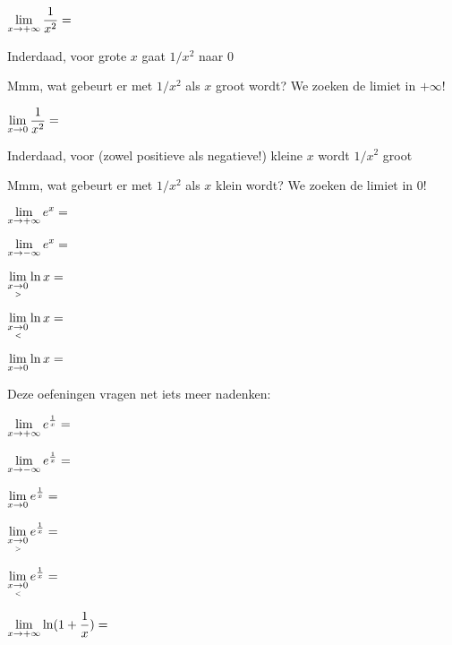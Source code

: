 \documentclass{ximera}
\begin{document}
\begin{exercise}
		\begin{question} \def\isC{correct}   $\limxi    \frac{1}{x^2}= \;$   \localoefoptions 
			\begin{feedback}[correct]Inderdaad, voor grote $x$  gaat $1/x^2$ naar $0$\end{feedback}	
			\begin{feedback}[attempt]Mmm, wat gebeurt er met $1/x^2$ als $x$ groot wordt? We zoeken de limiet in $+\infty$!\end{feedback}
		\end{question}
		\begin{question} \def\isA{correct}   $\limx     \frac{1}{x^2}= \;$   \localoefoptions 
			\begin{feedback}[correct]Inderdaad, voor (zowel positieve als negatieve!) kleine $x$ wordt $1/x^2$ groot \end{feedback}	
			\begin{feedback}[attempt]Mmm, wat gebeurt er met $1/x^2$ als $x$ klein wordt? We zoeken de limiet in $0$!\end{feedback}
		\end{question}

		\begin{question} \def\isA{correct}   $\limxi    e^x = \;$            \localoefoptions \end{question}
		\begin{question} \def\isB{correct}   $\limxmi   e^x = \;$            \localoefoptions \end{question}
		\begin{question} \def\isB{correct}   $\rlimx    \ln x = \;$          \localoefoptions \end{question}
		\begin{question} \def\isE{correct}   $\llimx    \ln x = \;$          \localoefoptions \end{question}
		\begin{question} \def\isE{correct}   $\limxz    \ln x = \;$          \localoefoptions \end{question}
		Deze oefeningen vragen net iets meer nadenken:				
		\begin{question} \def\isD{correct}   $\limxi    e^{\frac 1x} = \;$   \localoefoptions \end{question}
		\begin{question} \def\isC{correct}   $\limxmi   e^{\frac 1x} = \;$   \localoefoptions \end{question}
		\begin{question} \def\isE{correct}   $\limxz     e^{\frac 1x} = \;$   \localoefoptions \end{question}
		\begin{question} \def\isA{correct}   $\rlimx    e^{\frac 1x} = \;$   \localoefoptions \end{question}
		\begin{question} \def\isC{correct}   $\llimx    e^{\frac 1x} = \;$   \localoefoptions \end{question}
		\begin{question} \def\isC{correct}   $\limxi    \ln(1+ \frac 1x) = \;$ \localoefoptions \end{question}
		
\end{exercise}
\end{document}
